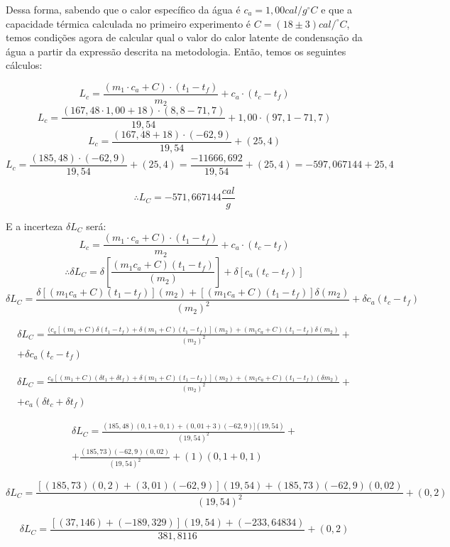Dessa forma, sabendo que o calor específico da água é $c_a= 1,00 cal/g^\circ C$ e que a capacidade térmica calculada no primeiro experimento é $C = (18 \pm 3) cal/^\circ C$, temos condições agora de calcular qual o valor do calor latente de condensação da água a partir da expressão descrita na metodologia. Então, temos os seguintes cálculos:

\[ L_c = \frac{(m_1 \cdot c_a + C) \cdot (t_1 - t_f)}{m_2} + c_a \cdot (t_c - t_f)\]
\[ L_c = \frac{(167,48 \cdot 1,00 + 18) \cdot (8,8 - 71,7)}{19,54} + 1,00 \cdot (97,1 - 71,7)\]
\[ L_c = \frac{(167,48 + 18) \cdot (- 62,9)}{19,54} + (25,4)\]
\[ L_c = \frac{(185,48) \cdot (- 62,9)}{19,54} + (25,4) = \frac{-11666,692}{19,54} + (25,4) = -597,067144 + 25,4\]

\[\therefore L_C = -571,667144 \frac{cal}{g}\]

E a incerteza  $\delta L_C$ será:
\[ L_c = \frac{(m_1 \cdot c_a + C) \cdot (t_1 - t_f)}{m_2} + c_a \cdot (t_c - t_f)\]
\[\therefore \delta L_C =  \delta \left[\frac{ (m_1 c_a + C) (t_1 - t_f) }{(m_2)}\right] +  \delta[c_a(t_c - t_f)] \]
\[\delta L_C =  \frac{ \delta[(m_1 c_a + C) (t_1 - t_f)] (m_2)  + [(m_1 c_a + C) (t_1 - t_f)] \delta (m_2) }{(m_2)^2} + \delta c_a(t_c - t_f) \]

\begin{multline*}
    \delta L_C =  \frac{(c_a [ (m_1 + C)  \delta(t_1 - t_f) + \delta (m_1 + C) (t_1 - t_f)] (m_2) + (m_1 c_a + C) (t_1 - t_f) \delta (m_2)  }{(m_2)^2} + \\
    + \delta c_a (t_c - t_f)
\end{multline*}

\begin{multline*}
    \delta L_C =  \frac{c_a [ (m_1 + C)  (\delta t_1 + \delta t_f) + \delta (m_1 + C) (t_1 - t_f)] (m_2) + (m_1 c_a + C) (t_1 - t_f) (\delta m_2)  }{(m_2)^2} +\\
    + c_a(\delta t_c + \delta t_f)
\end{multline*}

\begin{multline*}
    \delta L_C = \frac{(185,48) (0,1 + 0,1) + (0,01 + 3) (- 62,9)] (19,54)}{(19,54)^2} +\\
    + \frac{(185,73) (-62,9) (0,02)}{(19,54)^2} + (1) (0,1 + 0,1)
\end{multline*}

\[\delta L_C =  \frac{[ (185,73)  (0,2) + (3,01) (-62,9)] (19,54) + (185,73)(-62,9)(0,02)  }{(19,54)^2} + (0,2)\]

\[\delta L_C =  \frac{[ (37,146) + (-189,329)] (19,54) + (-233,64834)  }{381,8116} + (0,2)\]

